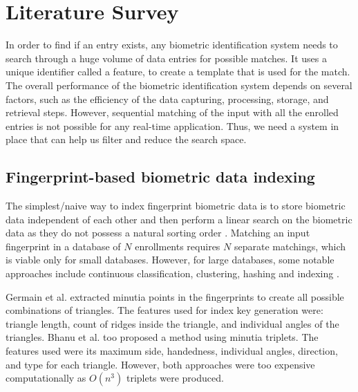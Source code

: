 
% 


\section{Literature Survey}
\label{sec2} 



In order to find if an entry exists, 
any biometric identification system needs to search through a huge volume of data entries for possible matches. 
It uses a unique identifier called a feature, to create a template that is used for the match. 
The overall performance of the biometric identification system depends on several factors, 
such as the efficiency of the data capturing, processing, storage, and retrieval steps. 
However, sequential matching of the input with all the enrolled entries is not possible for any real-time application. 
Thus, we need a system in place that can help us filter and reduce the search space.

\subsection{Fingerprint-based biometric data indexing}
The simplest/naive way to index fingerprint biometric data is to store biometric data independent of each other and 
then perform a linear search on the biometric data as they do not possess a natural sorting order \cite{cappelli2011index}. 
Matching an input fingerprint in a database of $N$ enrollments requires $N$ separate matchings, 
which is viable only for small databases. However, for large databases, some notable approaches include continuous classification, clustering, hashing and
indexing \cite{lumini1997continuous,schaler2013queval,aggarwal2014data,gu2013improved,Galar2015}.


Germain et al. \cite{Germain1997} extracted minutia points in the fingerprints to create all possible combinations of triangles. 
The features used for index key generation were: 
triangle length, 
count of ridges inside the triangle, and 
individual angles of the triangles. 
Bhanu et al. \cite{Bhanu2003} too proposed a method using minutia triplets. 
The features used were its 
maximum side, handedness, individual angles, direction, and type for each triangle.
However, both approaches were too expensive computationally as $O(n^3)$ triplets were produced.

